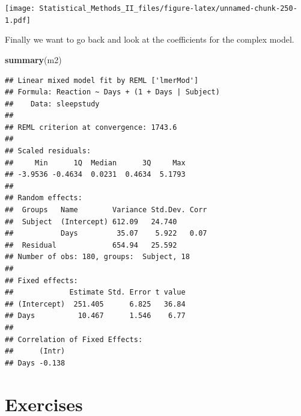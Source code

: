 \documentclass[]{book}
\newenvironment{Shaded}{\begin{snugshade}}{\end{snugshade}}
\newcommand{\KeywordTok}[1]{\textcolor[rgb]{0.13,0.29,0.53}{\textbf{{#1}}}}
\newcommand{\NormalTok}[1]{{#1}}
\theoremstyle{definition}
\theoremstyle{definition}
\theoremstyle{remark}
\begin{document}
\texttt{[image: Statistical\_Methods\_II\_files/figure-latex/unnamed-chunk-250-1.pdf]}

Finally we want to go back and look at the coefficients for the complex
model.

\begin{Shaded}
\begin{Highlighting}[]
\KeywordTok{summary}\NormalTok{(m2)}
\end{Highlighting}
\end{Shaded}

\begin{verbatim}
## Linear mixed model fit by REML ['lmerMod']
## Formula: Reaction ~ Days + (1 + Days | Subject)
##    Data: sleepstudy
## 
## REML criterion at convergence: 1743.6
## 
## Scaled residuals: 
##     Min      1Q  Median      3Q     Max 
## -3.9536 -0.4634  0.0231  0.4634  5.1793 
## 
## Random effects:
##  Groups   Name        Variance Std.Dev. Corr
##  Subject  (Intercept) 612.09   24.740       
##           Days         35.07    5.922   0.07
##  Residual             654.94   25.592       
## Number of obs: 180, groups:  Subject, 18
## 
## Fixed effects:
##             Estimate Std. Error t value
## (Intercept)  251.405      6.825   36.84
## Days          10.467      1.546    6.77
## 
## Correlation of Fixed Effects:
##      (Intr)
## Days -0.138
\end{verbatim}

\section{Exercises}\label{exercises-10}
\end{document}
